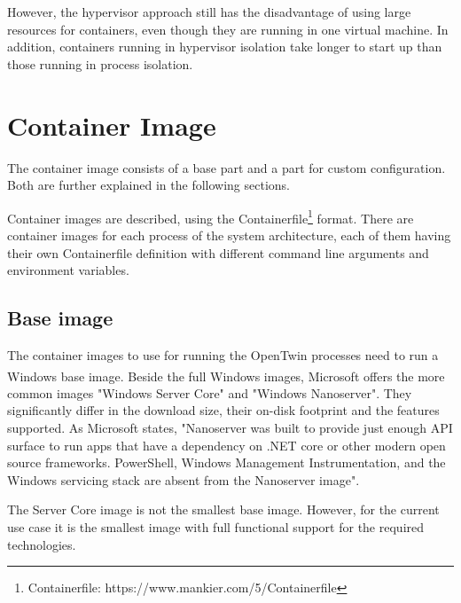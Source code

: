 However, the hypervisor approach still has the disadvantage of using large resources for containers, even though they are running in one virtual machine. In addition, containers running in hypervisor isolation take longer to start up than those running in process isolation\cite{RamosApolinario.2021}.




\section{Container Image}
The container image consists of a base part and a part for custom configuration. Both are further explained in the following sections.

Container images are described, using the Containerfile\footnote{Containerfile: https://www.mankier.com/5/Containerfile} format.
There are container images for each process of the system architecture, each of them having their own Containerfile definition with different command line arguments and environment variables.


\subsection{Base image}
The container images to use for running the OpenTwin processes need to run a \ac{Windows} base image. Beside the full \ac{Windows} images, Microsoft\textsuperscript{\tiny\textregistered} offers the more common images "\ac{Windows} Server Core" and "\ac{Windows} Nanoserver"\cite{MattbriggsMicrosoft.20230214}. They significantly differ in the download size, their on-disk footprint and the features supported\cite{MattbriggsMicrosoft.20230214}. As Microsoft states, "Nanoserver was built to provide just enough \ac{API} surface to run apps that have a dependency on .NET core or other modern open source frameworks. PowerShell, Windows Management Instrumentation, and the \ac{Windows} servicing stack are absent from the Nanoserver image"\cite{MattbriggsMicrosoft.20230214}.

The Server Core image is not the smallest base image. However, for the current use case it is the smallest image with full functional support for the required technologies. 


